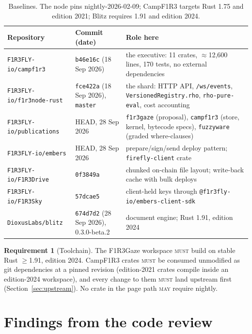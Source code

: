 \documentclass[11pt]{article}
\theoremstyle{definition}
\newtheorem{requirement}{Requirement}
\theoremstyle{remark}
\newcommand{\Camp}{CampF1R3}
\newcommand{\MUST}{\textsc{must}}
\newcommand{\MAY}{\textsc{may}}
\newcommand{\code}[1]{\texttt{#1}}
\newcommand{\Gz}{F1R3Gaze}
\begin{document}
\begin{table}[!htb]
\centering\small
\begin{tabularx}{\linewidth}{@{}lp{3.1cm}X@{}}
\toprule
Repository & Commit (date) & Role here\\
\midrule
\code{F1R3FLY-io/campf1r3} & \code{b46e16c} (18 Sep 2026) & the executive: 11 crates, $\approx$12{,}600 lines, 170 tests, no external dependencies\\
\code{F1R3FLY-io/f1r3node-rust} & \code{fce422a} (18 Sep 2026), \code{master} & the shard: HTTP API, \code{/ws/events}, \code{VersionedRegistry.rho}, \code{rho-pure-eval}, cost accounting\\
\code{F1R3FLY-io/publications} & HEAD, 28 Sep 2026 & \code{f1r3gaze} (proposal), \code{campf1r3} (store, kernel, bytecode specs), \code{fuzzyware} (graded where-clauses)\\
\code{F1R3FLY-io/embers} & HEAD, 28 Sep 2026 & prepare/sign/send deploy pattern; \code{firefly-client} crate\\
\code{F1R3FLY-io/F1R3Drive} & \code{0f3849a} & chunked on-chain file layout; write-back cache with bulk deploys\\
\code{F1R3FLY-io/F1R3Sky} & \code{57dcae5} & client-held keys through \code{@f1r3fly-io/embers-client-sdk}\\
\code{DioxusLabs/blitz} & \code{674d7d2} (28 Sep 2026), 0.3.0-beta.2 & document engine; Rust 1.91, edition 2024\\
\bottomrule
\end{tabularx}
\caption{Baselines. The node pins nightly-2026-02-09; \Camp{} targets Rust 1.75 and
edition 2021; Blitz requires 1.91 and edition 2024.}
\label{tab:pins}
\end{table}

\begin{requirement}[Toolchain]
The \Gz{} workspace \MUST{} build on stable Rust $\geq$1.91, edition 2024. \Camp{}
crates \MUST{} be consumed unmodified as git dependencies at a pinned revision
(edition-2021 crates compile inside an edition-2024 workspace), and every change to
them \MUST{} land upstream first (Section~\ref{sec:upstream}). No crate in the page
path \MAY{} require nightly.
\end{requirement}

\section{Findings from the code review}\label{sec:findings}
\end{document}
